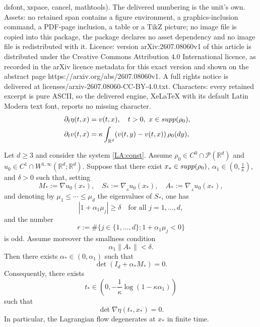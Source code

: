 \documentclass[10pt,a4paper]{amsart}
\newcommand{\R}{\mathbb R}
\newcommand{\bq}{\begin{equation}}
\newcommand{\calP}{\mathcal P}
\newcommand{\dy}{\textnormal{d}y}
\newcommand{\eq}{\end{equation}}
\renewcommand{\ge}{\geqslant}
\renewcommand{\geq}{\geqslant}
\newcommand{\intr}{\int_{\R^d}}
\renewcommand{\le}{\leqslant}
\newcommand{\lt}{\left}
\newcommand{\nabA}{\nabla_{\!\!{}_A}}
\newcommand{\nabS}{\nabla_{\!\!{}_S}}
\newcommand{\pa}{\partial}
\newcommand{\rt}{\right}
\newcommand{\supp}{{\rm supp}}
\begin{document}
dsfont, xspace, cancel, mathtools). The delivered numbering is the unit's own. Assets: no retained span contains a figure environment, a graphics-inclusion command, a PDF-page inclusion, a table or a TikZ picture; no image file is copied into this package, the package declares no asset dependency and no image file is redistributed with it. Licence: version arXiv:2607.08060v1 of this article is distributed under the Creative Commons Attribution 4.0 International licence, as recorded in the arXiv licence metadata for this exact version and shown on the abstract page https://arxiv.org/abs/2607.08060v1. A full rights notice is delivered at licenses/arxiv-2607.08060-CC-BY-4.0.txt. Characters: every retained excerpt is pure ASCII, so the delivered engine, XeLaTeX with its default Latin Modern text font, reports no missing character.
 \begin{align}\label{LA:const}
\begin{aligned}
&\pa_t \eta(t,x) = v(t,x), \quad t>0, \ x \in \supp(\rho_0), \cr
&\pa_t v(t,x)  = \kappa \intr   (v(t,y) - v(t,x))\,\rho_0(\dy),
\end{aligned}
\end{align}

\begin{corollary} \label{cor:gen_sup_const}
Let $d \geq 3$ and consider the system \eqref{LA:const}. Assume $\rho_0\in C^0\cap\calP(\R^d)$ and $u_0\in C^1\cap W^{1,\infty}(\R^d;\R^d)$. Suppose that there exist $x_*\in\supp(\rho_0)$, $\alpha_1\in(0,\frac1\kappa)$, and $\delta>0$ such that, setting
\[
M_*:=\nabla u_0(x_*),\quad S_*:=\nabS u_0(x_*),\quad A_*:=\nabA u_0(x_*),
\]
and denoting by $\mu_1\le\cdots\le\mu_d$ the eigenvalues of $S_*$, one has
\bq\label{eq:sep0}
|1+\alpha_1\mu_j|\ge \delta \quad\text{for all }j=1,\dots,d,
\eq
and the number
\[
r:=\#\{j\in\{1,\dots,d\}:1+\alpha_1\mu_j<0\}
\]
is odd. Assume moreover the smallness condition
\bq\label{eq:sma0}
\alpha_1\|A_*\|<\delta.
\eq
Then there exists $\alpha_*\in(0,\alpha_1)$ such that
\[
\det(I_d+\alpha_*M_*)=0.
\]
Consequently, there exists
\[
t_*\in\lt(0,-\frac1\kappa\log(1-\kappa\alpha_1)\rt)
\]
such that
\[
\det\nabla\eta(t_*,x_*)=0.
\]
In particular, the Lagrangian flow degenerates at $x_*$ in finite time.
\end{corollary}
\end{document}
